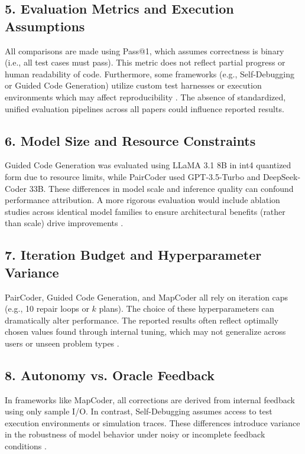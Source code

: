 \documentclass[11pt,a4paper]{article}
\begin{document}
\subsection*{5. Evaluation Metrics and Execution Assumptions}
All comparisons are made using Pass@1, which assumes correctness is binary (i.e., all test cases must pass). This metric does not reflect partial progress or human readability of code. Furthermore, some frameworks (e.g., Self-Debugging or Guided Code Generation) utilize custom test harnesses or execution environments which may affect reproducibility \cite{almorsi2025guided}. The absence of standardized, unified evaluation pipelines across all papers could influence reported results.

\subsection*{6. Model Size and Resource Constraints}
Guided Code Generation was evaluated using LLaMA 3.1 8B in int4 quantized form due to resource limits, while PairCoder used GPT-3.5-Turbo and DeepSeek-Coder 33B. These differences in model scale and inference quality can confound performance attribution. A more rigorous evaluation would include ablation studies across identical model families to ensure architectural benefits (rather than scale) drive improvements \cite{zhang2024paircoder, almorsi2025guided}.

\subsection*{7. Iteration Budget and Hyperparameter Variance}
PairCoder, Guided Code Generation, and MapCoder all rely on iteration caps (e.g., 10 repair loops or $k$ plans). The choice of these hyperparameters can dramatically alter performance. The reported results often reflect optimally chosen values found through internal tuning, which may not generalize across users or unseen problem types \cite{zhang2024paircoder, islam2024mapcodermultiagentcodegeneration}.

\subsection*{8. Autonomy vs. Oracle Feedback}
In frameworks like MapCoder, all corrections are derived from internal feedback using only sample I/O. In contrast, Self-Debugging assumes access to test execution environments or simulation traces. These differences introduce variance in the robustness of model behavior under noisy or incomplete feedback conditions \cite{almorsi2025guided, islam2024mapcodermultiagentcodegeneration}.
\end{document}

